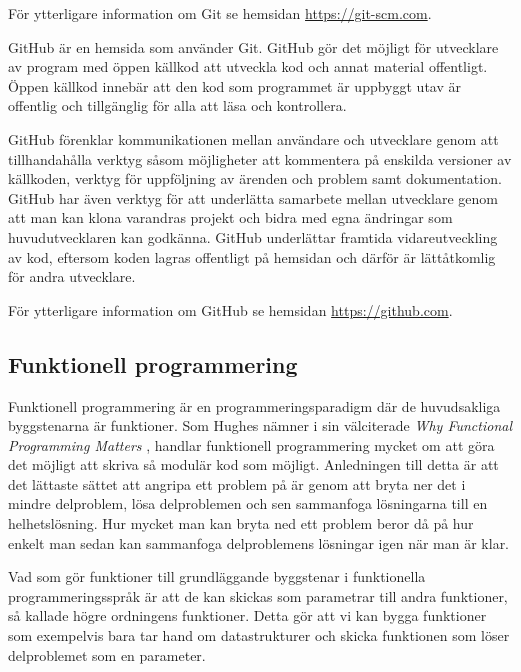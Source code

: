 \documentclass[12pt,a4paper,twoside,openright]{article}
\begin{document}
För ytterligare information om Git se hemsidan \url{https://git-scm.com}.

GitHub är en hemsida som använder Git. GitHub gör det möjligt för
utvecklare av program med öppen källkod att utveckla kod och annat
material offentligt. Öppen källkod innebär att den kod som programmet
är uppbyggt utav är offentlig och tillgänglig för alla att läsa och
kontrollera.

GitHub förenklar kommunikationen mellan användare och utvecklare 
genom att tillhandahålla verktyg såsom möjligheter att kommentera
på enskilda versioner av källkoden, verktyg för uppföljning av ärenden
och problem samt dokumentation. GitHub har även verktyg för att
underlätta samarbete mellan utvecklare genom att man kan klona
varandras projekt och bidra med egna ändringar som huvudutvecklaren
kan godkänna. GitHub underlättar framtida vidareutveckling av kod,
eftersom koden lagras offentligt på hemsidan och därför är
lättåtkomlig för andra utvecklare.

För ytterligare information om GitHub se hemsidan \url{https://github.com}.

\subsection{Funktionell programmering}
Funktionell programmering är en programmeringsparadigm där de
huvudsakliga byggstenarna är funktioner. Som Hughes nämner i sin
välciterade \textit{Why Functional Programming Matters}
\cite{hughes1989functional}, handlar funktionell programmering mycket
om att göra det möjligt att skriva så modulär kod som möjligt.
Anledningen till detta är att det lättaste sättet att angripa ett
problem på är genom att bryta ner det i mindre delproblem, lösa
delproblemen och sen sammanfoga lösningarna till en helhetslösning.
Hur mycket man kan bryta ned ett problem beror då på hur enkelt man
sedan kan sammanfoga delproblemens lösningar igen när man är klar.

Vad som gör funktioner till grundläggande byggstenar i funktionella
programmeringsspråk är att de kan skickas som parametrar till andra
funktioner, så kallade högre ordningens funktioner. Detta gör att vi
kan bygga funktioner som exempelvis bara tar hand om datastrukturer
och skicka funktionen som löser delproblemet som en parameter.
\end{document}
